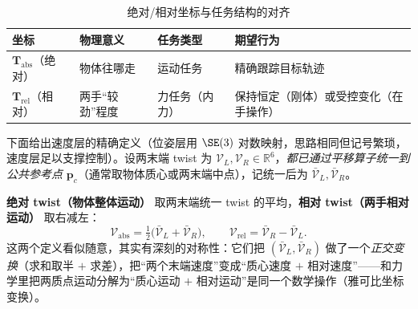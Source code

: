 \begin{table}[H]\centering\small
\caption{绝对/相对坐标与任务结构的对齐}
\label{tab:ma-absrel}
\begin{tabular}{llll}
\toprule
坐标 & 物理意义 & 任务类型 & 期望行为 \\
\midrule
$\mathbf{T}_{\text{abs}}$（绝对） & 物体往哪走 & 运动任务 & 精确跟踪目标轨迹 \\
$\mathbf{T}_{\text{rel}}$（相对） & 两手“较劲”程度 & 力任务（内力） & 保持恒定（刚体）或受控变化（在手操作） \\
\bottomrule
\end{tabular}
\end{table}

下面给出速度层的精确定义（位姿层用 $\SE(3)$ 对数映射，思路相同但记号繁琐，速度层足以支撑控制）。设两末端 twist 为 $\boldsymbol{\mathcal{V}}_L,\boldsymbol{\mathcal{V}}_R\in\mathbb{R}^6$，\emph{都已通过平移算子统一到公共参考点} $\mathbf{p}_c$（通常取物体质心或两末端中点），记统一后为 $\bar{\boldsymbol{\mathcal{V}}}_L,\bar{\boldsymbol{\mathcal{V}}}_R$。


\textbf{绝对 twist（物体整体运动）} 取两末端统一 twist 的平均，\textbf{相对 twist（两手相对运动）} 取右减左：
\begin{equation}
  \boldsymbol{\mathcal{V}}_{\text{abs}}=\tfrac12\big(\bar{\boldsymbol{\mathcal{V}}}_L+\bar{\boldsymbol{\mathcal{V}}}_R\big),
  \qquad
  \boldsymbol{\mathcal{V}}_{\text{rel}}=\bar{\boldsymbol{\mathcal{V}}}_R-\bar{\boldsymbol{\mathcal{V}}}_L.
  \label{eq:ma-absrel-twist}
\end{equation}
这两个定义看似随意，其实有深刻的对称性：它们把 $(\bar{}_L,\bar{}_R)$ 做了一个\emph{正交变换}（求和取半 $+$ 求差），把“两个末端速度”变成“质心速度 $+$ 相对速度”——和力学里把两质点运动分解为“质心运动 $+$ 相对运动”是同一个数学操作（雅可比坐标变换）。

